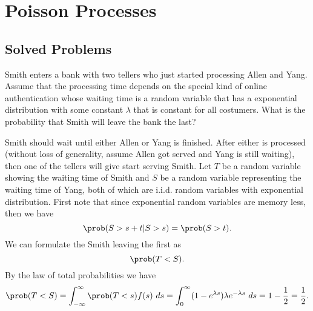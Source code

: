 \chapter{Poisson Processes}

\section{Solved Problems}
\begin{problem}
	Smith enters a bank with two tellers who just started processing Allen and Yang. Assume that the processing time depends on the special kind of online authentication whose waiting time is a random variable that has a exponential distribution with some constant $ \lambda $ that is constant for all costumers. What is the probability that Smith will leave the bank the last?
\end{problem}

\begin{solution}
	Smith should wait until either Allen or Yang is finished. After either is processed (without loss of generality, assume Allen got served and Yang is still waiting), then one of the tellers will give start serving Smith. Let $ T $ be a random variable showing the waiting time of Smith and $ S $ be a random variable representing the waiting time of Yang, both of which are i.i.d. random variables with exponential distribution. First note that since exponential random variables are memory less, then we have
	\[ \prob(S>s+t|S>s) = \prob(S>t). \]
	We can formulate the Smith leaving the first as 
	\[ \prob(T<S). \]
	By the law of total probabilities we have
	\[ \prob(T<S) = \int_{-\infty}^{\infty}\prob(T<s)f(s)\ ds = \int_{0}^{\infty}(1-e^{\lambda s}) \lambda e^{-\lambda s}\ ds = 1 - \frac12 = \frac12. \]
\end{solution}